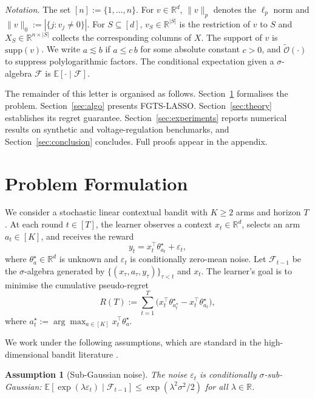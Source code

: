 \documentclass[journal,twoside,web]{ieeecolor}
\newtheorem{assumption}{Assumption}
\begin{document}
\textit{Notation.} The set $[n] := \{1,\dots,n\}$. For $v \in \mathbb{R}^d$, $\|v\|_p$ denotes the $\ell_p$ norm and $\|v\|_0 := |\{j: v_j \neq 0\}|$. For $S \subseteq [d]$, $v_S \in \mathbb{R}^{|S|}$ is the restriction of $v$ to $S$ and $X_S \in \mathbb{R}^{n \times |S|}$ collects the corresponding columns of $X$. The support of $v$ is $\mathrm{supp}(v)$. We write $a \lesssim b$ if $a \leq c\, b$ for some absolute constant $c > 0$, and $\tilde{\mathcal{O}}(\cdot)$ to suppress polylogarithmic factors. The conditional expectation given a $\sigma$-algebra $\mathcal{F}$ is $\mathbb{E}[\cdot \mid \mathcal{F}]$.

The remainder of this letter is organised as follows. Section~\ref{sec:problem} formalises the problem. Section~\ref{sec:algo} presents FGTS-LASSO. Section~\ref{sec:theory} establishes its regret guarantee. Section~\ref{sec:experiments} reports numerical results on synthetic and voltage-regulation benchmarks, and Section~\ref{sec:conclusion} concludes. Full proofs appear in the appendix.

\section{Problem Formulation}\label{sec:problem}

We consider a stochastic linear contextual bandit with $K \geq 2$ arms and horizon $T$. At each round $t \in [T]$, the learner observes a context $x_t \in \mathbb{R}^d$, selects an arm $a_t \in [K]$, and receives the reward
\begin{equation}
y_t = x_t^\top \theta^{\star}_{a_t} + \varepsilon_t,
\label{eq:model}
\end{equation}
where $\theta^{\star}_a \in \mathbb{R}^d$ is unknown and $\varepsilon_t$ is conditionally zero-mean noise. Let $\mathcal{F}_{t-1}$ be the $\sigma$-algebra generated by $\{(x_\tau, a_\tau, y_\tau)\}_{\tau<t}$ and $x_t$. The learner's goal is to minimise the cumulative pseudo-regret
\begin{equation}
R(T) := \sum_{t=1}^T \big( x_t^\top \theta^{\star}_{a_t^{\star}} - x_t^\top \theta^{\star}_{a_t} \big),
\label{eq:regret}
\end{equation}
where $a_t^{\star} := \arg\max_{a \in [K]} x_t^\top \theta^{\star}_a$.

We work under the following assumptions, which are standard in the high-dimensional bandit literature \cite{bastani2020online,oh2021sparsity,hao2020high}.

\begin{assumption}[Sub-Gaussian noise]\label{ass:noise}
The noise $\varepsilon_t$ is conditionally $\sigma$-sub-Gaussian: $\mathbb{E}[\exp(\lambda \varepsilon_t) \mid \mathcal{F}_{t-1}] \leq \exp(\lambda^2 \sigma^2 / 2)$ for all $\lambda \in \mathbb{R}$.
\end{assumption}
\end{document}
